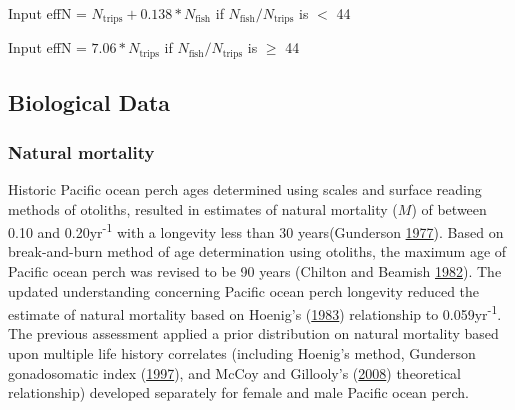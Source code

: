 \documentclass[12pt,]{article}
\begin{document}
\begin{centering}

Input effN = $N_{\text{trips}} + 0.138 * N_{\text{fish}}$ if $N_{\text{fish}}/N_{\text{trips}}$ is $<$ 44

Input effN = $7.06 * N_{\text{trips}}$ if $N_{\text{fish}}/N_{\text{trips}}$ is $\geq$ 44

\end{centering}

\subsection{Biological Data}\label{biological-data}

\subsubsection{Natural mortality}\label{natural-mortality}

Historic Pacific ocean perch ages determined using scales and surface
reading methods of otoliths, resulted in estimates of natural mortality
(\(M\)) of between 0.10 and 0.20yr\textsuperscript{-1} with a longevity
less than 30 years(Gunderson
\protect\hyperlink{ref-gunderson_population_1977}{1977}). Based on
break-and-burn method of age determination using otoliths, the maximum
age of Pacific ocean perch was revised to be 90 years (Chilton and
Beamish \protect\hyperlink{ref-chilton_age_1982}{1982}). The updated
understanding concerning Pacific ocean perch longevity reduced the
estimate of natural mortality based on Hoenig's
(\protect\hyperlink{ref-hoenig_empirical_1983}{1983}) relationship to
0.059yr\textsuperscript{-1}. The previous assessment applied a prior
distribution on natural mortality based upon multiple life history
correlates (including Hoenig's method, Gunderson gonadosomatic index
(\protect\hyperlink{ref-gunderson_trade-off_1997}{1997}), and McCoy and
Gillooly's (\protect\hyperlink{ref-mccoy_predicting_2008}{2008})
theoretical relationship) developed separately for female and male
Pacific ocean perch.
\end{document}
